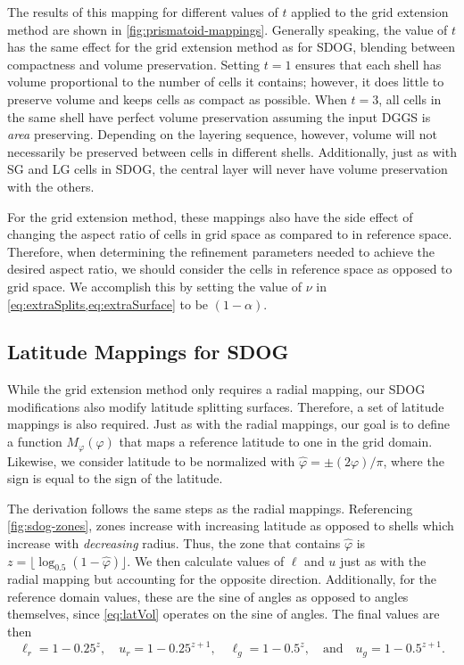 The results of this mapping for different values of $t$ applied to the grid extension method are shown in \cref{fig:prismatoid-mappings}.
Generally speaking, the value of $t$ has the same effect for the grid extension method as for SDOG, blending between compactness and volume preservation.
Setting $t=1$ ensures that each shell has volume proportional to the number of cells it contains; however, it does little to preserve volume and keeps cells as compact as possible.
When $t=3$, all cells in the same shell have perfect volume preservation assuming the input DGGS is \textit{area} preserving.
Depending on the layering sequence, however, volume will not necessarily be preserved between cells in different shells.
Additionally, just as with SG and LG cells in SDOG, the central layer will never have volume preservation with the others.


For the grid extension method, these mappings also have the side effect of changing the aspect ratio of cells in grid space as compared to in reference space.
Therefore, when determining the refinement parameters needed to achieve the desired aspect ratio, we should consider the cells in reference space as opposed to grid space.
We accomplish this by setting the value of $\nu$ in \cref{eq:extraSplits,eq:extraSurface} to be $(1 - \alpha)$.


\subsection{Latitude Mappings for SDOG} \label{chap:6:latitude}
While the grid extension method only requires a radial mapping, our SDOG modifications also modify latitude splitting surfaces.
Therefore, a set of latitude mappings is also required.
Just as with the radial mappings, our goal is to define a function $M_\varphi(\varphi)$ that maps a reference latitude to one in the grid domain. Likewise, we consider latitude to be normalized with $\hat{\varphi} = \pm (2\varphi) / \pi$, where the sign is equal to the sign of the latitude.


The derivation follows the same steps as the radial mappings.
Referencing \cref{fig:sdog-zones}, zones increase with increasing latitude as opposed to shells which increase with \textit{decreasing} radius.
Thus, the zone that contains $\hat{\varphi}$ is $z = \lfloor \log_{0.5} ( 1 - \hat{\varphi} ) \rfloor$.
We then calculate values of $\ell$ and $u$ just as with the radial mapping but accounting for the opposite direction.
Additionally, for the reference domain values, these are the sine of angles as opposed to angles themselves, since \cref{eq:latVol} operates on the sine of angles.
The final values are then
%
\begin{equation*}
\ell_r = 1 - 0.25^{z}, \quad u_r = 1 - 0.25^{z + 1}, \quad \ell_g = 1 - 0.5^z, \quad \text{and} \quad u_g = 1 - 0.5^{z + 1}.
\end{equation*}
%

